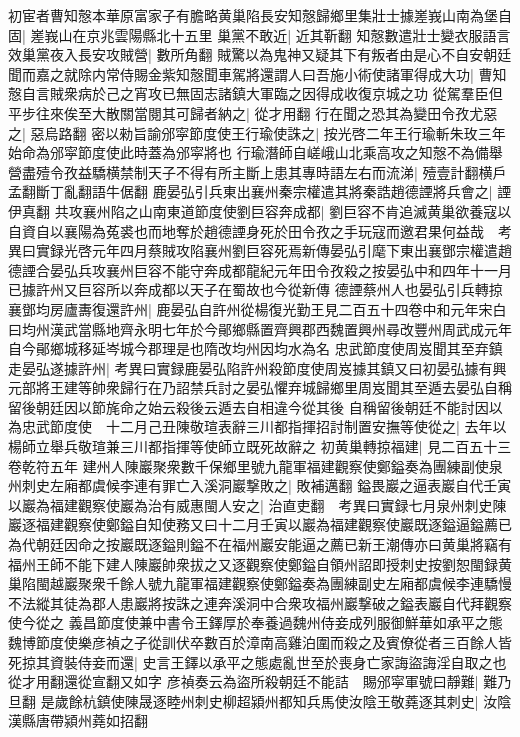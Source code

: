 初宦者曹知慤本華原富家子有膽略黄巢陷長安知慤歸鄉里集壯士據嵳峩山南為堡自固|{
	嵳峩山在京兆雲陽縣北十五里}
巢黨不敢近|{
	近其靳翻}
知慤數遣壯士變衣服語言效巢黨夜入長安攻賊營|{
	數所角翻}
賊驚以為鬼神又疑其下有叛者由是心不自安朝廷聞而嘉之就除内常侍賜金紫知慤聞車駕將還謂人曰吾施小術使諸軍得成大功|{
	曹知慤自言賊衆病於己之宵攻已無固志諸鎮大軍臨之因得成收復京城之功}
從駕羣臣但平步往來俟至大散關當閱其可歸者納之|{
	從才用翻}
行在聞之恐其為變田令孜尤惡之|{
	惡烏路翻}
密以勑旨諭邠寜節度使王行瑜使誅之|{
	按光啓二年王行瑜斬朱玫三年始命為邠寜節度使此時蓋為邠寜將也}
行瑜潛師自嵯峨山北乘高攻之知慤不為備舉營盡殪令孜益驕横禁制天子不得有所主斷上患其專時語左右而流涕|{
	殪壹計翻横戶孟翻斷丁亂翻語牛倨翻}
鹿晏弘引兵東出襄州秦宗權遣其將秦誥趙德諲將兵會之|{
	諲伊真翻}
共攻襄州陷之山南東道節度使劉巨容奔成都|{
	劉巨容不肯追滅黄巢欲養寇以自資自以襄陽為菟裘也而地奪於趙德諲身死於田令孜之手玩寇而邀君果何益哉　考異曰實録光啓元年四月蔡賊攻陷襄州劉巨容死焉新傳晏弘引麾下東出襄鄧宗權遣趙德諲合晏弘兵攻襄州巨容不能守奔成都龍紀元年田令孜殺之按晏弘中和四年十一月已據許州又巨容所以奔成都以天子在蜀故也今從新傳}
德諲蔡州人也晏弘引兵轉掠襄鄧均房廬夀復還許州|{
	鹿晏弘自許州從楊復光勤王見二百五十四卷中和元年宋白曰均州漢武當縣地齊永明七年於今鄖鄉縣置齊興郡西魏置興州尋改豐州周武成元年自今鄖鄉城移延岑城今郡理是也隋改均州因均水為名}
忠武節度使周岌聞其至弃鎮走晏弘遂據許州|{
	考異曰實録鹿晏弘陷許州殺節度使周岌據其鎮又曰初晏弘據有興元部將王建等帥衆歸行在乃詔禁兵討之晏弘懼弃城歸鄉里周岌聞其至遁去晏弘自稱留後朝廷因以節旄命之始云殺後云遁去自相違今從其後}
自稱留後朝廷不能討因以為忠武節度使　十二月己丑陳敬瑄表辭三川都指揮招討制置安撫等使從之|{
	去年以楊師立舉兵敬瑄兼三川都指揮等使師立既死故辭之}
初黄巢轉掠福建|{
	見二百五十三卷乾符五年}
建州人陳巖聚衆數千保鄉里號九龍軍福建觀察使鄭鎰奏為團練副使泉州刺史左廂都虞候李連有罪亡入溪洞巖撃敗之|{
	敗補邁翻}
鎰畏巖之逼表巖自代壬寅以巖為福建觀察使巖為治有威惠閩人安之|{
	治直吏翻　考異曰實録七月泉州刺史陳巖逐福建觀察使鄭鎰自知使務又曰十二月壬寅以巖為福建觀察使巖既逐鎰逼鎰薦已為代朝廷因命之按巖既逐鎰則鎰不在福州巖安能逼之薦已新王潮傳亦曰黄巢將竊有福州王師不能下建人陳巖帥衆拔之又逐觀察使鄭鎰自領州詔即授刺史按劉恕閩録黄巢陷閩越巖聚衆千餘人號九龍軍福建觀察使鄭鎰奏為團練副史左廂都虞候李連驕慢不法縱其徒為郡人患巖將按誅之連奔溪洞中合衆攻福州巖撃破之鎰表巖自代拜觀察使今從之}
義昌節度使兼中書令王鐸厚於奉養過魏州侍妾成列服御鮮華如承平之態魏博節度使樂彦禎之子從訓伏卒數百於漳南高雞泊圍而殺之及賓僚從者三百餘人皆死掠其資裝侍妾而還|{
	史言王鐸以承平之態處亂世至於喪身亡家誨盜誨淫自取之也從才用翻還從宣翻又如字}
彦禎奏云為盜所殺朝廷不能詰　賜邠寜軍號曰靜難|{
	難乃旦翻}
是歲餘杭鎮使陳晟逐睦州刺史柳超潁州都知兵馬使汝陰王敬蕘逐其刺史|{
	汝陰漢縣唐帶潁州蕘如招翻}
